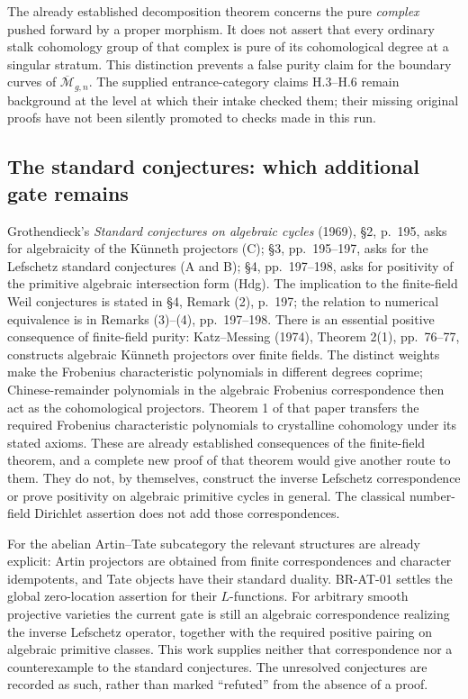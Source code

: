 The already established decomposition theorem concerns the pure
\emph{complex} pushed forward by a proper morphism.  It does not
assert that every ordinary stalk cohomology group of that complex
is pure of its cohomological degree at a singular stratum.  This
distinction prevents a false purity claim for the boundary curves
of $\overline{\mathcal M}_{g,n}$.  The supplied entrance-category
claims H.3--H.6 remain background at the level at which their intake
checked them; their missing original proofs have not been silently
promoted to checks made in this run.

\subsection{The standard conjectures: which additional gate remains}

Grothendieck's \emph{Standard conjectures on algebraic cycles}
(1969), \S2, p.~195, asks for algebraicity of the K\"unneth
projectors (C); \S3, pp.~195--197, asks for the Lefschetz
standard conjectures (A and B); \S4, pp.~197--198, asks for
positivity of the primitive algebraic intersection form (Hdg).
The implication to the finite-field Weil conjectures is stated in
\S4, Remark (2), p.~197; the relation to numerical equivalence
is in Remarks (3)--(4), pp.~197--198.
There is an essential positive consequence of finite-field purity:
Katz--Messing (1974), Theorem 2(1), pp.~76--77, constructs algebraic
K\"unneth projectors over finite fields.  The distinct weights make the
Frobenius characteristic polynomials in different degrees coprime;
Chinese-remainder polynomials in the algebraic Frobenius correspondence
then act as the cohomological projectors.  Theorem 1 of that paper
transfers the required Frobenius characteristic polynomials to crystalline
cohomology under its stated axioms.  These are already established
consequences of the finite-field theorem, and a complete new proof of
that theorem would give another route to them.  They do not, by
themselves, construct the inverse Lefschetz correspondence or prove
positivity on algebraic primitive cycles in general.  The classical
number-field Dirichlet assertion does not add those correspondences.

For the abelian Artin--Tate subcategory the relevant structures are
already explicit: Artin projectors are obtained from finite
correspondences and character idempotents, and Tate objects have
their standard duality.  BR-AT-01 settles the global zero-location
assertion for their $L$-functions.  For arbitrary smooth projective
varieties the current gate is still an algebraic correspondence
realizing the inverse Lefschetz operator, together with the
required positive pairing on algebraic primitive classes.  This
work supplies neither that correspondence nor a counterexample to
the standard conjectures.  The unresolved conjectures are recorded
as such, rather than marked ``refuted'' from the absence of a proof.

